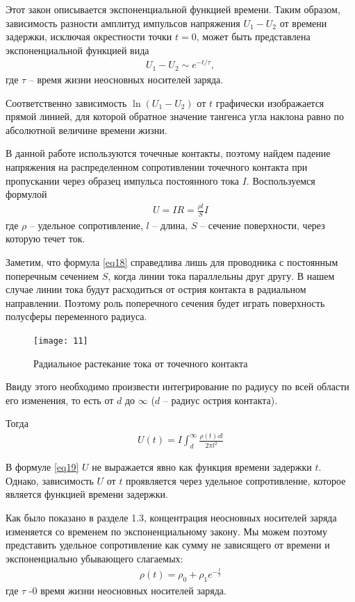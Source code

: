 \documentclass[a4paper,14pt]{extarticle}
\begin{document}
Этот закон описывается экспоненциальной функцией времени. Таким образом, зависимость разности амплитуд импульсов напряжения  $U_1-U_2$ от времени задержки, исключая окрестности точки $t = 0$, может быть представлена экспоненциальной функцией вида
\begin{gather}
	\label{eq17}
	U_{1}-U_{2} \sim e^{-t/\tau},
\end{gather}
где $\tau$ -- время жизни неосновных носителей заряда.

Соответственно зависимость $\ln(U_1-U_2)$ от $t$ графически изображается прямой линией, для которой обратное значение тангенса угла наклона равно по абсолютной величине времени жизни.

В данной работе используются точечные контакты, поэтому найдем падение напряжения на распределенном сопротивлении точечного контакта при пропускании через образец импульса постоянного тока $I$. Воспользуемся формулой
\begin{gather}
	\label{eq18}
	U=I R=\frac{\rho l}{S} I
\end{gather}
где $\rho$ -- удельное сопротивление, $l$ -- длина, $S$ -- сечение поверхности, через которую течет ток. 

Заметим, что формула \eqref{eq18} справедлива лишь для проводника с постоянным поперечным сечением $S$, когда линии тока параллельны друг другу. 
В нашем случае линии тока будут расходиться от острия контакта в радиальном направлении. Поэтому роль поперечного сечения будет играть поверхность полусферы переменного радиуса.
\begin{figure}[H]
	\centering
	\texttt{[image: 11]}
	\caption{Радиальное растекание тока от точечного контакта}
	\label{fig:figure10}
\end{figure}

Ввиду этого необходимо произвести интегрирование по радиусу по всей области его изменения, то есть от $d$ до $\infty$ ($d$ -- радиус острия контакта). 

Тогда
\begin{gather}
	\label{eq19}
	U(t)=I \int_{d}^{\infty} \frac{\rho(t) \dd l}{2 \pi l^{2}}
\end{gather}

В формуле \eqref{eq19} $U$ не выражается явно как функция времени задержки $t$. Однако, зависимость $U$ от $t$ проявляется через удельное сопротивление, которое является функцией времени задержки.

Как было показано в разделе 1.3, концентрация неосновных носителей заряда изменяется со временем по экспоненциальному закону. Мы можем поэтому представить удельное сопротивление как сумму не зависящего от времени и экспоненциально убывающего слагаемых: 
\begin{gather}
	\label{eq20}
	\rho(t)=\rho_{0}+\rho_{1} e^{-\frac{t}{\tau}}
\end{gather}
где $\tau$ -0 время жизни неосновных носителей заряда.
\end{document}
